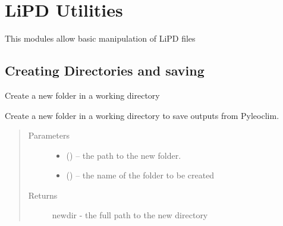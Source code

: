 \documentclass[letterpaper,10pt,english]{sphinxmanual}
\begin{document}
\chapter{LiPD Utilities}
\label{\detokenize{LipdUtils:lipd-utilities}}\label{\detokenize{LipdUtils::doc}}
This modules allow basic manipulation of LiPD files


\section{Creating Directories and saving}
\label{\detokenize{LipdUtils:creating-directories-and-saving}}

\begin{fulllineitems}
\label{\detokenize{LipdUtils:pyleoclim.LipdUtils.createDir}}
Create a new folder in a working directory

Create a new folder in a working directory to save outputs from Pyleoclim.
\begin{quote}\begin{description}
\item[{Parameters}] \leavevmode\begin{itemize}
\item {} 
 () -- the path to the new folder.

\item {} 
 () -- the name of the folder to be created

\end{itemize}

\item[{Returns}] \leavevmode
newdir - the full path to the new directory

\end{description}\end{quote}

\end{fulllineitems}

\end{document}

